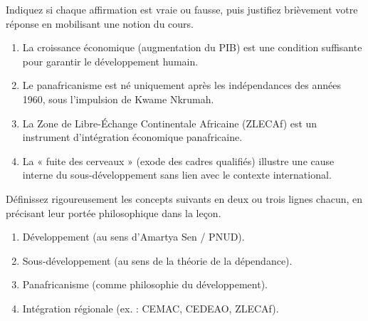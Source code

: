 \documentclass[11pt]{article}
\begin{document}
\begin{exercice}
Indiquez si chaque affirmation est vraie ou fausse, puis justifiez brièvement votre réponse en mobilisant une notion du cours.

\begin{enumerate}
\item La croissance économique (augmentation du PIB) est une condition suffisante pour garantir le développement humain.
\item Le panafricanisme est né uniquement après les indépendances des années 1960, sous l'impulsion de Kwame Nkrumah.
\item La Zone de Libre-Échange Continentale Africaine (ZLECAf) est un instrument d'intégration économique panafricaine.
\item La « fuite des cerveaux » (exode des cadres qualifiés) illustre une cause interne du sous-développement sans lien avec le contexte international.
\end{enumerate}
\end{exercice}

\begin{exercice}
Définissez rigoureusement les concepts suivants en deux ou trois lignes chacun, en précisant leur portée philosophique dans la leçon.

\begin{enumerate}
\item Développement (au sens d'Amartya Sen / PNUD).
\item Sous-développement (au sens de la théorie de la dépendance).
\item Panafricanisme (comme philosophie du développement).
\item Intégration régionale (ex. : CEMAC, CEDEAO, ZLECAf).
\end{enumerate}
\end{exercice}
\end{document}
